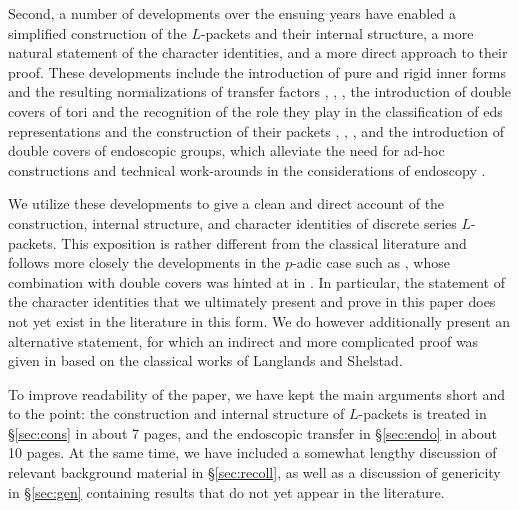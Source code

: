 \documentclass{article}
\theoremstyle{definition}
\numberwithin{equation}{section}
\renewcommand{\-}{\hyp{}}
\begin{document}
Second, a number of developments over the ensuing years have enabled a simplified construction of the $L$\-packets and their internal structure, a more natural statement of the character identities, and a more direct approach to their proof. These developments include the introduction of pure and rigid inner forms and the resulting normalizations of transfer factors \cite{Vog93}, \cite{KalECI}, \cite{KalRI}, the introduction of double covers of tori and the recognition of the role they play in the classification of eds representations and the construction of their packets \cite{AV92}, \cite{AV16}, \cite{KalDC}, and the introduction of double covers of endoscopic groups, which alleviate the need for ad-hoc constructions and technical work-arounds in the considerations of endoscopy \cite{KalHDC}. 

We utilize these developments to give a clean and direct account of the construction, internal structure, and character identities of discrete series $L$\-packets. This exposition is rather different from the classical literature and follows more closely the developments in the $p$-adic case such as \cite{KalRSP}, whose combination with double covers was hinted at in \cite{KalDC}. In particular, the statement of the character identities that we ultimately present and prove in this paper does not yet exist in the literature in this form. We do however additionally present an alternative statement, for which an indirect and more complicated proof was given in \cite{KalRI} based on the classical works of Langlands and Shelstad.

To improve readability of the paper, we have kept the main arguments short and to the point: the construction and internal structure of $L$-packets is treated in \S\ref{sec:cons} in about 7 pages, and the endoscopic transfer in \S\ref{sec:endo} in about 10 pages. At the same time, we have included a somewhat lengthy discussion of relevant background material in \S\ref{sec:recoll}, as well as a discussion of genericity in \S\ref{sec:gen} containing results that do not yet appear in the literature.
\end{document}
